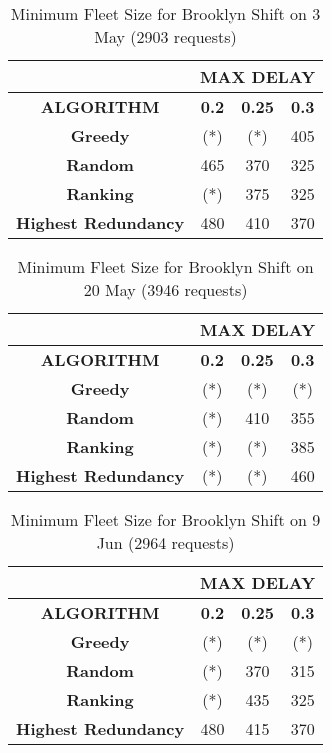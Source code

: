 \documentclass[urop]{socreport}
\begin{document}
\begin{table}[h!]
    \centering
    \begin{tabular}{|c|c|c|c|}
        \hline
         & \multicolumn{3}{|c|}{\textbf{MAX DELAY}}\\
         \hline
         \textbf{ALGORITHM} & \textbf{0.2} & \textbf{0.25}& \textbf{0.3}\\
         \hline \hline
         \textbf{Greedy} & (*) & (*) & 405\\
         \hline
         \textbf{Random} & 465 & 370 & 325\\
         \hline
         \textbf{Ranking} & (*) & 375 & 325\\
         \hline
         \textbf{Highest Redundancy} & 480 & 410 & 370\\
        \hline
    \end{tabular}
    \caption{Minimum Fleet Size for Brooklyn Shift on 3 May (2903 requests)}
    \label{tab:exp2_0305}
\end{table}

\begin{table}[h!]
    \centering
    \begin{tabular}{|c|c|c|c|}
        \hline
         & \multicolumn{3}{|c|}{\textbf{MAX DELAY}}\\
         \hline
         \textbf{ALGORITHM} & \textbf{0.2} & \textbf{0.25}& \textbf{0.3}\\
         \hline \hline
         \textbf{Greedy} & (*) & (*) & (*)\\
         \hline
         \textbf{Random} & (*) & 410 & 355\\
         \hline
         \textbf{Ranking} & (*) & (*) & 385\\
         \hline
         \textbf{Highest Redundancy} & (*) & (*) & 460\\
        \hline
    \end{tabular}
    \caption{Minimum Fleet Size for Brooklyn Shift on 20 May (3946 requests)}
    \label{tab:exp2_2005}
\end{table}

\begin{table}[h!]
    \centering
    \begin{tabular}{|c|c|c|c|}
        \hline
         & \multicolumn{3}{|c|}{\textbf{MAX DELAY}}\\
         \hline
         \textbf{ALGORITHM} & \textbf{0.2} & \textbf{0.25}& \textbf{0.3}\\
         \hline \hline
         \textbf{Greedy} & (*) & (*) & (*)\\
         \hline
         \textbf{Random} & (*) & 370 & 315\\
         \hline
         \textbf{Ranking} & (*) & 435 & 325\\
         \hline
         \textbf{Highest Redundancy} & 480 & 415 & 370\\
        \hline
    \end{tabular}
    \caption{Minimum Fleet Size for Brooklyn Shift on 9 Jun (2964 requests)}
    \label{tab:exp2_0906}
\end{table}
\end{document}
